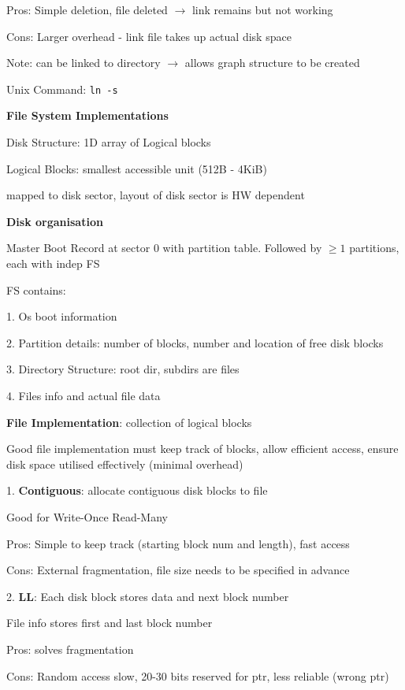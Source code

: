 \documentclass[10pt, a4paper]{article}
\newcommand{\blue}[1]{{\color{MidnightBlue}#1}}
\newcommand{\red}[1]{{\color{red}#1}}
\newcommand{\green}[1]{{\color{ForestGreen}#1}}
\newcommand{\tab}[0]{\hspace*{2mm}}
\begin{document}
\begin{multicols*}{3}
		\green{Pros}: Simple deletion, file deleted $\rightarrow$ link remains but not working

		\red{Cons}: Larger overhead - link file takes up actual disk space

		\red{Note}: can be linked to directory $\rightarrow$ allows graph structure to be created

		Unix Command: \texttt{ln -s}

		\textbf{File System Implementations}

		Disk Structure: 1D array of \blue{Logical blocks}

		\blue{Logical Blocks}: smallest accessible unit (512B - 4KiB)

		\tab{} mapped to disk sector, layout of disk sector is HW dependent

		\textbf{Disk organisation}

		Master Boot Record at sector 0 with partition table. Followed by $\geq 1$ partitions, each with indep FS

		FS contains: 

		1. Os boot information

		2. Partition details: number of blocks, number and location of free disk blocks 

		3. Directory Structure: root dir, subdirs are files

		4. Files info and actual file data

		\textbf{File Implementation}: collection of logical blocks

		Good file implementation must \blue{keep track} of blocks, allow \blue{efficient} access, ensure disk
		space utilised \blue{effectively} (minimal overhead)

		1. \textbf{Contiguous}: allocate contiguous disk blocks to file

		Good for Write-Once Read-Many

		\green{Pros}: Simple to keep track (starting block num and length), fast access

		\red{Cons}: External fragmentation, file size needs to be specified in advance

		2. \textbf{LL}: Each disk block stores data and \blue{next block number} 

		File info stores first and last block number

		\green{Pros}: solves fragmentation

		\red{Cons}: Random access slow, 20-30 bits reserved for ptr, less reliable (wrong ptr)
		

\end{multicols*}
\end{document}
